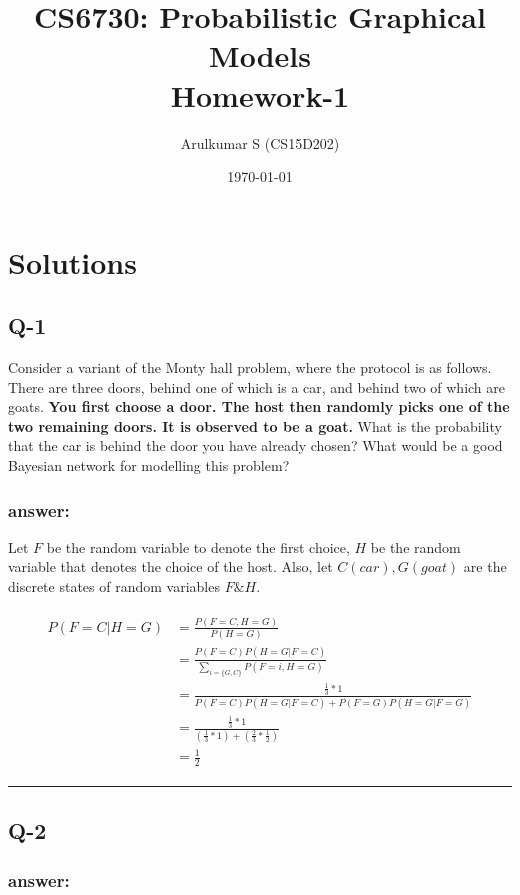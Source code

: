 \documentclass[fleqn]{article}
\title{CS6730: Probabilistic Graphical Models \\ Homework-1}
\author{Arulkumar S (CS15D202)}
\date{\today}
\begin{document}
\maketitle
\section*{Solutions}
\subsection*{Q-1}

Consider a variant of the Monty hall problem, where the protocol is as follows. There are three doors, behind one of which is a car, and behind two of
which are goats. \textbf{You first choose a door. The host then randomly picks one of the two remaining doors.
It is observed to be a goat.} What is the probability that the car is behind the door you have already chosen? What would be a good Bayesian network
for modelling this problem?

\subsubsection*{answer:}

Let $F$ be the random variable to denote the first choice, $H$ be the random variable that denotes the choice of the host. Also, let $C (car), G
(goat)$ are the discrete states of random variables $F \& H$.

\begin{eqnarray}
\begin{aligned}
P(F=C | H=G) &= \frac{P(F=C, H=G)}{P(H=G)}\\
			 &= \frac{P(F=C)P(H=G|F=C)}{\sum_{i=\{G,C\}} P(F=i, H=G)}\\ 
			 &= \frac{\frac{1}{3} * 1}{P(F=C)P(H=G|F=C) + P(F=G)P(H=G|F=G)}\\
			 &= \frac{\frac{1}{3} * 1}{(\frac{1}{3} * 1) + (\frac{2}{3} * \frac{1}{2})}\\
			 &= \frac{1}{2}
\end{aligned}
\end{eqnarray}

\noindent\rule{\textwidth}{1pt}

\subsection*{Q-2}
\subsubsection*{answer:}
\end{document}
